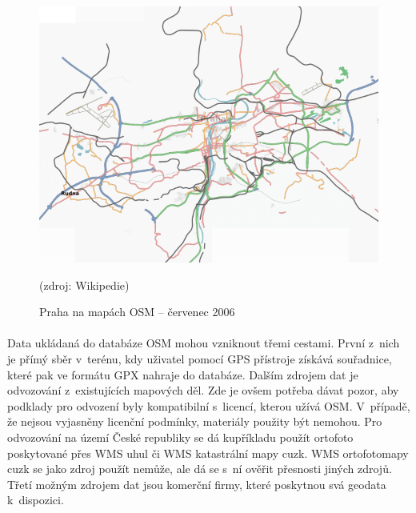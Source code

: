 \documentclass[11pt,a4paper,titlepage,oneside]{book}
\begin{document}
		\begin{figure}[!h]
			\begin{center}
				\includegraphics[width=12cm]{obrazky/Osm-200607-praha.png}
				\caption{Praha na mapách \ac{OSM} -- červenec 2006} (zdroj: Wikipedie\cite{osm_wikipedia_cs})
				\label{fig:praha2006}
			\end{center}
		\end{figure}





		\paragraph{} Data ukládaná do databáze \acl{OSM} mohou vzniknout třemi cestami. První z~nich je přímý sběr v~terénu, kdy uživatel pomocí GPS přístroje získává souřadnice, které pak ve formátu \ac{GPX} nahraje do databáze. Dalším zdrojem dat je odvozování z~existujících mapových děl. Zde je ovšem potřeba dávat pozor, aby podklady pro odvození  byly kompatibilní s~licencí, kterou užívá \ac{OSM}. V~případě, že nejsou vyjasněny licenční podmínky, materiály použity být nemohou. Pro odvozování na území České republiky se dá kupříkladu použít ortofoto poskytované přes \ac{WMS} \ac{uhul} či \ac{WMS} katastrální mapy \ac{cuzk}\cite{freemap}. \ac{WMS} ortofotomapy \ac{cuzk} se jako zdroj použít nemůže, ale dá se s~ní ověřit přesnosti jiných zdrojů. Třetí možným zdrojem dat jsou komerční firmy, které poskytnou svá geodata k~dispozici.
\end{document}
